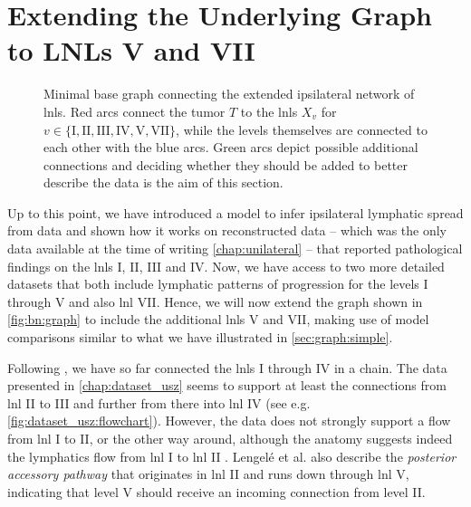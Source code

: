 \documentclass[\relativeRoot/main.tex]{subfiles}
\begin{document}
\section{Extending the Underlying Graph to LNLs V and VII}
\label{sec:graph:extended}

\begin{figure}
    \centering
    \def\svgwidth{0.4\textwidth}
    
    \caption[
        Base graph of the extended ipsilateral model with possible additional edges
    ]{
        Minimal base graph connecting the extended ipsilateral network of \glspl{lnl}. Red arcs connect the tumor $T$ to the \glspl{lnl} $X_v$ for $v \in \{ \text{I}, \text{II}, \text{III}, \text{IV}, \text{V}, \text{VII} \}$, while the levels themselves are connected to each other with the blue arcs. Green arcs depict possible additional connections and deciding whether they should be added to better describe the data is the aim of this section.
    }
    \label{fig:graph:extended_graph}
\end{figure}

Up to this point, we have introduced a model to infer ipsilateral lymphatic spread from data and shown how it works on reconstructed data -- which was the only data available at the time of writing \cref{chap:unilateral} -- that reported pathological findings on the \glspl{lnl} I, II, III and IV. Now, we have access to two more detailed datasets that both include lymphatic patterns of progression for the levels I through V and also \gls{lnl} VII. Hence, we will now extend the graph shown in \cref{fig:bn:graph} to include the additional \glspl{lnl} V and VII, making use of model comparisons similar to what we have illustrated in \cref{sec:graph:simple}.

Following \cite{pouymayou_bayesian_2019}, we have so far connected the \glspl{lnl} I through IV in a chain. The data presented in \cref{chap:dataset_usz} seems to support at least the connections from \gls{lnl} II to III and further from there into \gls{lnl} IV (see e.g. \cref{fig:dataset_usz:flowchart}). However, the data does not strongly support a flow from \gls{lnl} I to II, or the other way around, although the anatomy suggests indeed the lymphatics flow from \gls{lnl} I to \gls{lnl} II \cite{lengele_anatomical_2007}. Lengelé et al. \cite{lengele_anatomical_2007} also describe the \emph{posterior accessory pathway} that originates in \gls{lnl} II and runs down through \gls{lnl} V, indicating that level V should receive an incoming connection from level II.
\end{document}
